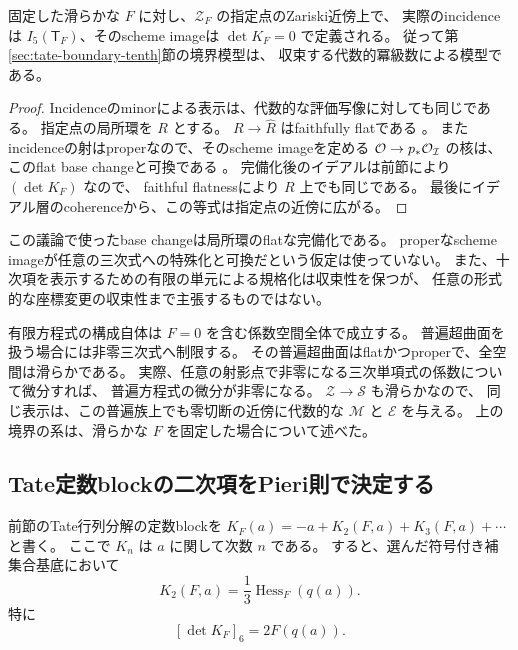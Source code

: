 \begin{corollary}
\label{cor:algebraic-analytic-tate-boundary}
固定した滑らかな $F$ に対し、$\mathcal Z_F$ の指定点のZariski近傍上で、
実際のincidenceは $I_5(\mathsf T_F)$、そのscheme imageは
$\det K_F=0$ で定義される。
従って第\ref{sec:tate-boundary-tenth}節の境界模型は、
収束する代数的冪級数による模型である。
\end{corollary}
\begin{proof}
Incidenceのminorによる表示は、代数的な評価写像に対しても同じである。
指定点の局所環を $R$ とする。
$R\to\widehat R$ はfaithfully flatである
\cite[Lemma 10.97.3, Tag 00MC]{StacksFaithfulCompletion}。
またincidenceの射はproperなので、そのscheme imageを定める
$\mathcal O\to p_*\mathcal O_{\mathcal I}$ の核は、このflat base changeと可換である
\cite[Lemma 30.5.2, Tag 02KH]{StacksFlatBaseChange}。
完備化後のイデアルは前節により $(\det K_F)$ なので、
faithful flatnessにより $R$ 上でも同じである。
最後にイデアル層のcoherenceから、この等式は指定点の近傍に広がる。
\end{proof}

この議論で使ったbase changeは局所環のflatな完備化である。
properなscheme imageが任意の三次式への特殊化と可換だという仮定は使っていない。
また、十次項を表示するための有限の単元による規格化は収束性を保つが、
任意の形式的な座標変更の収束性まで主張するものではない。

\begin{remark}[三次式を動かす場合]
有限方程式の構成自体は $F=0$ を含む係数空間全体で成立する。
普遍超曲面を扱う場合には非零三次式へ制限する。
その普遍超曲面はflatかつproperで、全空間は滑らかである。
実際、任意の射影点で非零になる三次単項式の係数について微分すれば、
普遍方程式の微分が非零になる。
$\mathcal Z\to\mathcal S$ も滑らかなので、
同じ表示は、この普遍族上でも零切断の近傍に代数的な $\mathcal M$ と
$\mathcal E$ を与える。
上の境界の系は、滑らかな $F$ を固定した場合について述べた。
\end{remark}

\subsection{Tate定数blockの二次項をPieri則で決定する}
\label{subsec:v9-tate-second-block}

\begin{proposition}\label{prop:v9-K2-hessian}
前節のTate行列分解の定数blockを
$K_F(a)=-a+K_2(F,a)+K_3(F,a)+\cdots$ と書く。
ここで $K_n$ は $a$ に関して次数 $n$ である。
すると、選んだ符号付き補集合基底において
\[
                     K_2(F,a)=\frac13\operatorname{Hess}_F(q(a)).
\]
特に
\[
                    [\det K_F]_6=2F(q(a)).
\]
\end{proposition}

